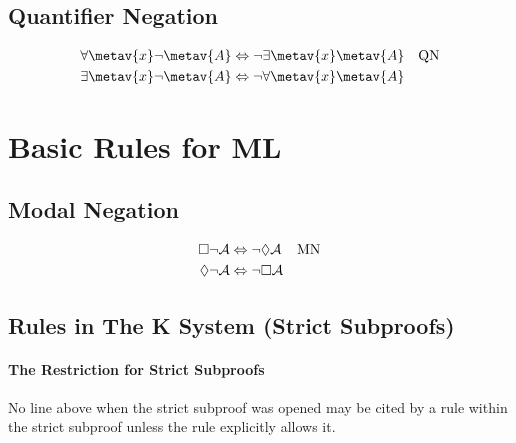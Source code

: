 \subsection*{Quantifier Negation}

\begin{align*}
\forall \metav{x}\enot \metav{A} & \Leftrightarrow \enot \exists \metav{x} \metav{A} &&\text{QN}\\
\exists \metav{x}\enot \metav{A} & \Leftrightarrow \enot \forall \metav{x} \metav{A}
\end{align*}
\newpage
\section{Basic Rules for ML}
\subsection*{Modal Negation}
\begin{align*}
\Box\neg\mathcal{A} & \Leftrightarrow \neg \Diamond\mathcal{A} &&\text{MN}\\
\Diamond\neg\mathcal{A} & \Leftrightarrow \neg \Box\mathcal{A}
\end{align*}

\subsection*{Rules in The K System (Strict Subproofs)}

\paragraph{The Restriction for Strict Subproofs}
No line above when the strict subproof was opened may be cited by a rule within the strict subproof unless the rule explicitly allows it. 
\begin{multicols}{2}

\begin{fitchproof}
\open
{}
\close	
{}
\end{fitchproof}


\begin{fitchproof}
\open
{}
\close
{}	
\end{fitchproof}

\begin{fitchproof}
\open
{}
\close
{}	
\end{fitchproof}

\begin{fitchproof}
\open
{}
\close
{}	
\end{fitchproof}
\end{multicols}

